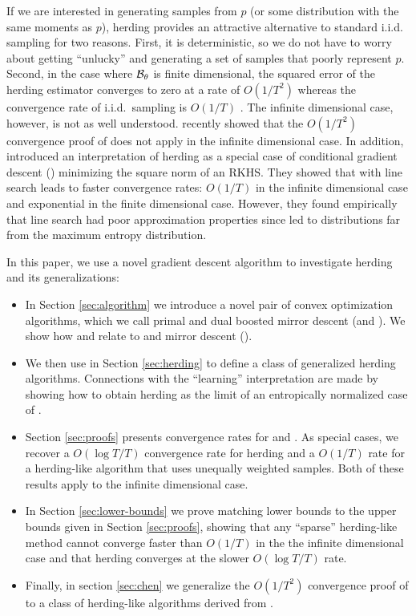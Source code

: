 \documentclass[paper.tex]{subfiles}
\begin{document}
If we are interested in generating samples from $p$ (or some distribution with the same moments as $p$), herding provides an attractive alternative to standard i.i.d. sampling for two reasons. First, it is deterministic, so we do not have to worry about getting ``unlucky'' and generating a set of samples that poorly represent  $p$. Second, in the case where $\mathcal{B}_{\theta}$ is finite dimensional, the squared error of the herding estimator converges to zero at a rate of $O(1/T^{2})$ whereas the convergence rate of i.i.d.~sampling is $O(1/T)$ \citep{Chen:2010a}. The infinite dimensional case, however, is not as well understood. \citet{Bach:2012a} recently showed that the $O(1/T^{2})$ convergence proof of \citet{Chen:2010a} does not apply in the infinite dimensional case. In addition, \citet{Bach:2012a} introduced an interpretation of herding as a special case of conditional gradient descent (\cgd) minimizing the square norm of an RKHS. They showed that \cgd with line search leads to faster convergence rates: $O(1/T)$ in the infinite dimensional case and exponential in the finite dimensional case. However, they found  empirically that line search had poor approximation properties since led to distributions far from the maximum entropy distribution. 

In this paper, we use a novel gradient descent algorithm to investigate herding and its generalizations:
\begin{itemize}
\item In Section \ref{sec:algorithm} we introduce a novel pair of convex optimization algorithms, which we call primal and dual boosted mirror descent (\primal and \dual). We show how \primal and \dual relate to \cgd and mirror descent (\md). 
\item We then use \dual in Section \ref{sec:herding} to define a class of generalized herding algorithms. Connections with the ``learning'' interpretation are made by showing how to obtain herding as the limit of an entropically normalized case of \dual. 
\item Section \ref{sec:proofs} presents convergence rates for \primal and \dual. As special cases, we recover a $O(\log T/ T)$ convergence rate for herding and a $O(1/T)$ rate for a herding-like algorithm that uses unequally weighted samples. Both of these results apply to the infinite dimensional case. 
\item In Section \ref{sec:lower-bounds} we prove matching lower bounds to the upper bounds given in Section \ref{sec:proofs}, showing that any ``sparse'' herding-like method cannot converge faster than $O(1/T)$ in the the infinite dimensional case and that herding converges at the slower $O(\log T / T)$ rate.
\item Finally, in section \ref{sec:chen} we generalize the $O(1/T^{2})$ convergence proof of \citet{Chen:2010a} to a class of herding-like algorithms derived from \bmd. 
\end{itemize}
\end{document}
